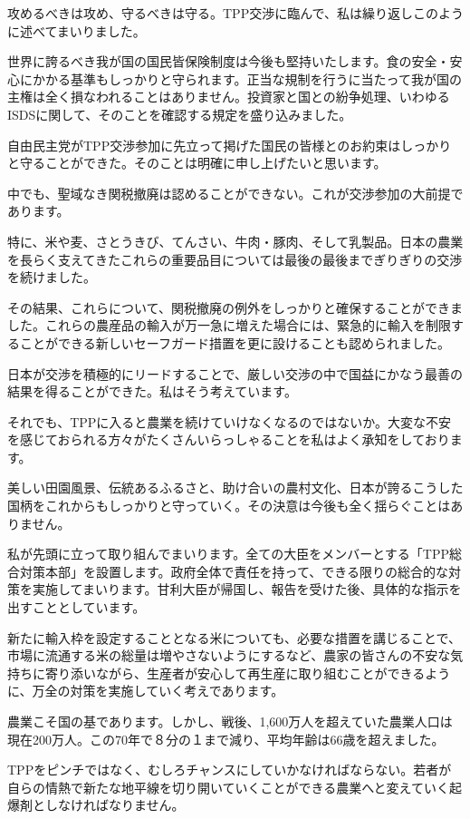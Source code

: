攻めるべきは攻め、守るべきは守る。TPP交渉に臨んで、私は繰り返しこのように述べてまいりました。\par
世界に誇るべき我が国の国民皆保険制度は今後も堅持いたします。食の安全・安心にかかる基準もしっかりと守られます。正当な規制を行うに当たって我が国の主権は全く損なわれることはありません。投資家と国との紛争処理、いわゆるISDSに関して、そのことを確認する規定を盛り込みました。\par
自由民主党がTPP交渉参加に先立って掲げた国民の皆様とのお約束はしっかりと守ることができた。そのことは明確に申し上げたいと思います。\par
中でも、聖域なき関税撤廃は認めることができない。これが交渉参加の大前提であります。\par
特に、米や麦、さとうきび、てんさい、牛肉・豚肉、そして乳製品。日本の農業を長らく支えてきたこれらの重要品目については最後の最後までぎりぎりの交渉を続けました。\par
その結果、これらについて、関税撤廃の例外をしっかりと確保することができました。これらの農産品の輸入が万一急に増えた場合には、緊急的に輸入を制限することができる新しいセーフガード措置を更に設けることも認められました。\par
日本が交渉を積極的にリードすることで、厳しい交渉の中で国益にかなう最善の結果を得ることができた。私はそう考えています。\par
それでも、TPPに入ると農業を続けていけなくなるのではないか。大変な不安を感じておられる方々がたくさんいらっしゃることを私はよく承知をしております。\par
美しい田園風景、伝統あるふるさと、助け合いの農村文化、日本が誇るこうした国柄をこれからもしっかりと守っていく。その決意は今後も全く揺らぐことはありません。\par
私が先頭に立って取り組んでまいります。全ての大臣をメンバーとする「TPP総合対策本部」を設置します。政府全体で責任を持って、できる限りの総合的な対策を実施してまいります。甘利大臣が帰国し、報告を受けた後、具体的な指示を出すこととしています。\par
新たに輸入枠を設定することとなる米についても、必要な措置を講じることで、市場に流通する米の総量は増やさないようにするなど、農家の皆さんの不安な気持ちに寄り添いながら、生産者が安心して再生産に取り組むことができるように、万全の対策を実施していく考えであります。\par
農業こそ国の基であります。しかし、戦後、1,600万人を超えていた農業人口は現在200万人。この70年で８分の１まで減り、平均年齢は66歳を超えました。\par
TPPをピンチではなく、むしろチャンスにしていかなければならない。若者が自らの情熱で新たな地平線を切り開いていくことができる農業へと変えていく起爆剤としなければなりません。\par
